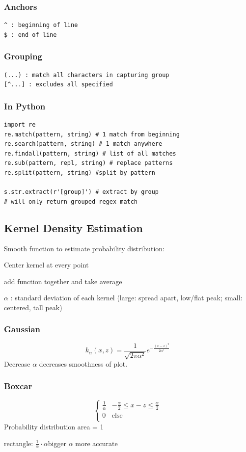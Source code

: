 \documentclass[8pt]{extarticle}
\begin{document}
\subsubsection*{Anchors}
\begin{verbatim}
^ : beginning of line
$ : end of line
\end{verbatim}

\subsubsection*{Grouping}
\begin{verbatim}
(...) : match all characters in capturing group
[^...] : excludes all specified
\end{verbatim}

\subsubsection*{In Python}
\begin{verbatim}
import re
re.match(pattern, string) # 1 match from beginning
re.search(pattern, string) # 1 match anywhere
re.findall(pattern, string) # list of all matches
re.sub(pattern, repl, string) # replace patterns
re.split(pattern, string) #split by pattern

s.str.extract(r'[group]') # extract by group
# will only return grouped regex match
\end{verbatim}
\hline

\subsection*{Kernel Density Estimation}
Smooth function to estimate probability distribution:

Center kernel at every point\par
add function together and take average\par
$\alpha$ : standard deviation of each kernel (large: spread apart, low/flat peak; small: centered, tall peak)\par

\subsubsection*{Gaussian}
$$ k_\alpha(x, z)=\frac{1}{\sqrt{2\pi\alpha^2}}e^{-\frac{(x-z)^2}{2\alpha^2}} $$
Decrease $\alpha$ decreases smoothness of plot.
\subsubsection*{Boxcar}
$$   \left\{
\begin{array}{ll}
      \frac{1}{\alpha} & -\frac{\alpha}{2} \leq x-z \leq  \frac{\alpha}{2}\\
      0 & \text{else} \\
\end{array}
\right. $$
Probability distribution area = 1\par
rectangle: $ \frac{1}{\alpha} \cdot \alpha $bigger $\alpha$ more accurate\\
\hline
\end{document}
